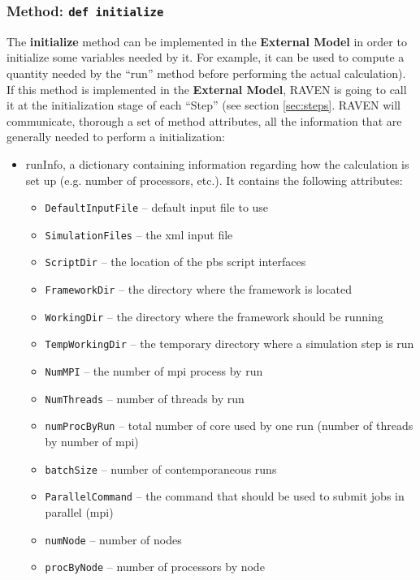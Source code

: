 \subsubsection{Method: \texttt{def initialize}}
\label{subsubsec:externalInitialize}
The \textbf{initialize} method can be implemented in the \textbf{External Model}
in order to initialize some variables needed by it.
%
For example, it can be used to compute a quantity needed by the ``run'' method
before performing the actual calculation).
%
If this method is implemented in the \textbf{External Model}, RAVEN is going to
call it at the initialization stage of each ``Step'' (see section
\ref{sec:steps}.
%
RAVEN will communicate, thorough a set of method attributes, all the information
that are generally needed to perform a initialization:
\begin{itemize}
  \item runInfo, a dictionary containing information regarding how the
  calculation is set up (e.g. number of processors, etc.).
  It contains the following attributes:
  \begin{itemize}
    \item \texttt{DefaultInputFile} -- default input file to use
    \item \texttt{SimulationFiles} -- the xml input file
    \item \texttt{ScriptDir} -- the location of the pbs script interfaces
    \item \texttt{FrameworkDir} -- the directory where the framework is located
    \item \texttt{WorkingDir} -- the directory where the framework should be
    running
    \item \texttt{TempWorkingDir} -- the temporary directory where a simulation
    step is run
    \item \texttt{NumMPI} -- the number of mpi process by run
    \item \texttt{NumThreads} -- number of threads by run
    \item \texttt{numProcByRun} -- total number of core used by one run (number
    of threads by number of mpi)
    \item \texttt{batchSize} -- number of contemporaneous runs
    \item \texttt{ParallelCommand} -- the command that should be used to submit
    jobs in parallel (mpi)
    \item \texttt{numNode} -- number of nodes
    \item \texttt{procByNode} -- number of processors by node

\end{itemize}
\end{itemize}
